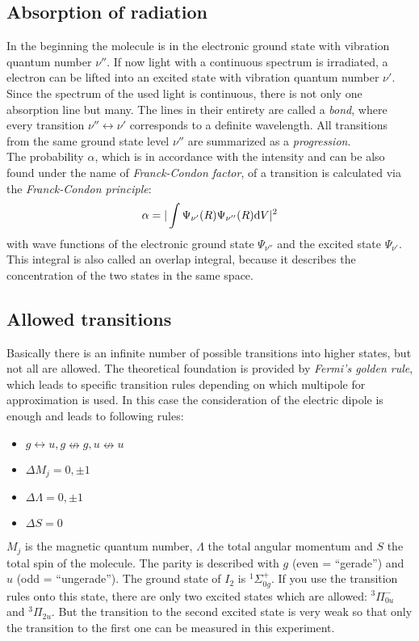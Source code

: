 \subsection{Absorption of radiation}
In the beginning the molecule is in the electronic ground state with vibration quantum number $\nu''$. If now light with a continuous spectrum is 
irradiated, a electron can be lifted into an excited state with vibration quantum number $\nu'$. Since the spectrum of the used light is continuous, there is not only one 
absorption line but many. The lines in their entirety are called a \emph{bond}, where every transition $\nu'' \leftrightarrow \nu'$ corresponds to 
a definite wavelength. All transitions from the same ground state level $\nu''$ are summarized as a \emph{progression}.\\
The probability $\alpha$, which is in accordance with the intensity and can be also found under the name of \emph{Franck-Condon factor}, 
of a transition is calculated via the \emph{Franck-Condon principle}:
\begin{equation}
  \alpha = | \int \Psi_{\nu'}(R) \Psi_{\nu''}(R) \mathrm{d} V |^2
\end{equation}
with wave functions of the electronic ground state $\Psi_{\nu''}$ and the excited state $\Psi_{\nu'}$.
This integral is also called an overlap integral, because it describes the concentration of the two states in the same space.

\subsection{Allowed transitions}
Basically there is an infinite number of possible transitions into higher states, but not all are allowed. The theoretical foundation is provided 
by \emph{Fermi's golden rule}, which leads to specific transition rules depending on which multipole for approximation is used. In this case the consideration of the 
electric dipole is enough and leads to following rules:
\begin{itemize}
  \item $g \leftrightarrow u, g \nleftrightarrow g, u \nleftrightarrow u$
  \item $\Delta M_j = 0, \pm 1$
  \item $\Delta \Lambda = 0, \pm 1$
  \item $\Delta S = 0$
\end{itemize}
$M_j$ is the magnetic quantum number, $\Lambda$ the total angular momentum and $S$ the total spin of the molecule. The parity is described with
$g$ (even = ``gerade'') and $u$ (odd = ``ungerade''). The ground state of $I_2$ is ${}^{1}\Sigma_{0g}^+$. 
If you use the transition rules onto this state, there are only two excited states which are 
allowed: ${}^3 \Pi_{0u}^-$ and ${}^3 \Pi_{2u}$. But the transition to the second excited state is very weak so that only the transition to the 
first one can be measured in this experiment.


